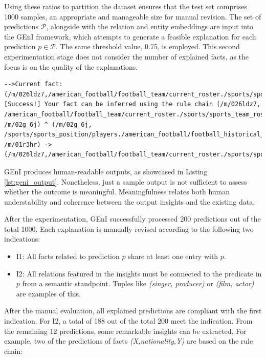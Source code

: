 Using these ratios to partition the dataset ensures that the test set comprises 1000 samples, an appropriate and manageable size for manual revision. The set of predictions $\mathcal{P}$, alongside with the relation and entity embeddings are input into the GEnI framework, which attempts to generate a feasible explanation for each prediction $p \in \mathcal{P}$. The same threshold value, 0.75, is employed. This second experimentation stage does not consider the number of explained facts, as the focus is on the quality of the explanations.

\begin{lstlisting}[captionpos=t, float=tp,floatplacement=tbp, breaklines=true, caption=Example of the output produced by the GEnI framework., label=lst:geni_output,basicstyle=\ttfamily,frame=single]
-->Current fact: (/m/026ldz7,/american_football/football_team/current_roster./sports/sports_team_roster/position,/m/01r3hr)
[Success!] Your fact can be inferred using the rule chain (/m/026ldz7, /american_football/football_team/current_roster./sports/sports_team_roster/position, /m/02g_6j) ^ (/m/02g_6j, /sports/sports_position/players./american_football/football_historical_roster_position/position_s, /m/01r3hr) -> (/m/026ldz7,/american_football/football_team/current_roster./sports/sports_team_roster/position,/m/01r3hr)
\end{lstlisting}

GEnI produces human-readable outputs, as showcased in Listing \ref{lst:geni_output}. Nonetheless, just a sample output is not sufficient to assess whether the outcome is meaningful. Meaningfulness relates both human understability and coherence between the output insights and the existing data. 

After the experimentation, GEnI successfully processed 200 predictions out of the total 1000. Each explanation is manually revised according to the following two indications:
\begin{itemize}
    \item I1: All facts related to prediction $p$ share at least one entry with $p$.
    \item I2: All relations featured in the insights must be connected to the predicate in $p$ from a semantic standpoint. Tuples like \textit{(singer, producer)} or \textit{(film, actor)} are examples of this.
\end{itemize}

After the manual evaluation, all explained predictions are compliant with the first indication. For I2, a total of 188 out of the total 200 meet the indication. From the remaining 12 predictions, some remarkable insights can be extracted. For example, two of the predictions of facts \textit{(X,nationality,Y)} are based on the rule chain: 

